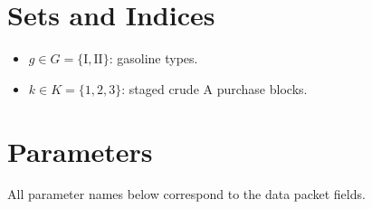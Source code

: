 \section*{Sets and Indices}

\begin{itemize}
    \item $g \in G = \{\mathrm{I}, \mathrm{II}\}$: gasoline types.
    \item $k \in K = \{1,2,3\}$: staged crude A purchase blocks.
\end{itemize}

\section*{Parameters}

All parameter names below correspond to the data packet fields.

